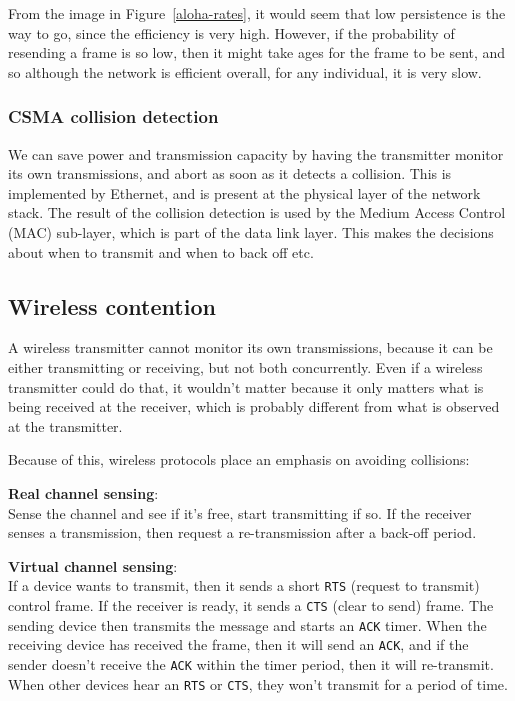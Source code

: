 From the image in Figure~\ref{aloha-rates}, it would seem that low persistence
is the way to go, since the efficiency is very high. However, if the probability
of resending a frame is so low, then it might take ages for the frame to be
sent, and so although the network is efficient overall, for any individual, it
is very slow.

\subsubsection{CSMA collision detection}

We can save power and transmission capacity by having the transmitter monitor
its own transmissions, and abort as soon as it detects a collision. This is
implemented by Ethernet, and is present at the physical layer of the network
stack. The result of the collision detection is used by the Medium Access
Control (MAC) sub-layer, which is part of the data link layer. This makes the
decisions about when to transmit and when to back off etc.

\subsection{Wireless contention}

A wireless transmitter cannot monitor its own transmissions, because it can be
either transmitting or receiving, but not both concurrently. Even if a wireless
transmitter could do that, it wouldn't matter because it only matters what is
being received at the receiver, which is probably different from what is
observed at the transmitter.

Because of this, wireless protocols place an emphasis on avoiding collisions:

\begin{description}
  \item \textbf{Real channel sensing}:\\
    Sense the channel and see if it's free, start transmitting if so. If the
    receiver senses a transmission, then request a re-transmission after a 
    back-off period.
  \item \textbf{Virtual channel sensing}:\\
    If a device wants to transmit, then it sends a short \texttt{RTS} (request
    to transmit) control frame. If the receiver is ready, it sends a
    \texttt{CTS} (clear to send) frame. The sending device then transmits the 
    message and starts an \texttt{ACK} timer. When the receiving device has
    received the frame, then it will send an \texttt{ACK}, and if the sender
    doesn't receive the \texttt{ACK} within the timer period, then it will
    re-transmit. When other devices hear an \texttt{RTS} or \texttt{CTS}, they
    won't transmit for a period of time.
\end{description}

